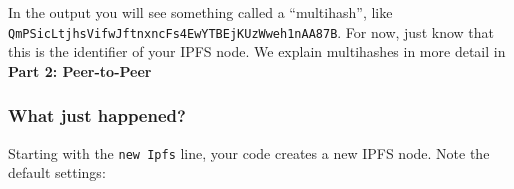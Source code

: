 \begin{Shaded}
\begin{Highlighting}[]

\OperatorTok{=}  \NormalTok{(}\OperatorTok{\{}
  \OperatorTok{:} \OperatorTok{\{} \OperatorTok{:}  \OperatorTok{\},}
  \OperatorTok{:} \OperatorTok{,}
  \OperatorTok{:} \OperatorTok{\{} \OperatorTok{:}  \OperatorTok{\},}
  \OperatorTok{:} \OperatorTok{\{}
    \OperatorTok{:}\NormalTok{ []}\OperatorTok{,}
    \OperatorTok{:} \OperatorTok{\{} \OperatorTok{:}\NormalTok{ [] }\OperatorTok{\}}
  \OperatorTok{\}}
\OperatorTok{\}}\NormalTok{)}\OperatorTok{;}

\NormalTok{(}\OperatorTok{,}\OperatorTok{=>} \OperatorTok{\{}   \OperatorTok{\}}\NormalTok{)}
\NormalTok{(}\OperatorTok{,} \NormalTok{ () }\OperatorTok{=>} \OperatorTok{\{}
\OperatorTok{=}
  \NormalTok{(}\NormalTok{)}
\OperatorTok{\}}\NormalTok{)}
\end{Highlighting}
\end{Shaded}

In the output you will see something called a ``multihash'', like
\texttt{QmPSicLtjhsVifwJftnxncFs4EwYTBEjKUzWweh1nAA87B}. For now, just
know that this is the identifier of your IPFS node. We explain
multihashes in more detail in \textbf{Part 2: Peer-to-Peer}

\subsubsection{What just happened?}\label{what-just-happened}

Starting with the \texttt{new\ Ipfs} line, your code creates a new IPFS
node. Note the default settings:

